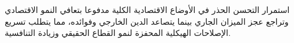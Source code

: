استمرار التحسن الحذر في الأوضاع الاقتصادية الكلية مدفوعا بتعافي النمو الاقتصادي وتراجع عجز الميزان الجاري بينما يتصاعد الدين الخارجي وفوائده، مما يتطلب تسريع الإصلاحات الهيكلية المحفزة لنمو القطاع الحقيقي وزيادة التنافسية.
